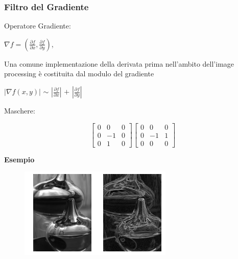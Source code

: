 \subsubsection{Filtro del Gradiente}

Operatore Gradiente:

\begin{center}
    $\nabla f=(\frac{\partial{f}}{\partial{x}}, \frac{\partial{f}}{\partial{y}})$,
\end{center}

Una comune implementazione della derivata prima nell'ambito dell'image processing è costituita dal modulo del gradiente

\begin{center}
    $| \nabla f(x,y) |$ $\sim$ $|\frac{\partial{f}}{\partial{x}}|$ $+$ $|\frac{\partial{f}}{\partial{y}}|$
\end{center}

Maschere:

\begin{center}
    \[
        \begin{bmatrix}
            0 & 0  & 0 \\
            0 & -1 & 0 \\
            0 & 1  & 0
        \end{bmatrix}
        \begin{bmatrix}
            0 & 0  & 0 \\
            0 & -1 & 1 \\
            0 & 0  & 0
        \end{bmatrix}
    \]
\end{center}

\textbf{Esempio}

\begin{figure}[H]
    \centering
    \includegraphics[width=\linewidth, keepaspectratio]{capitoli/immagini/imgs/gradiente.png}
\end{figure}


